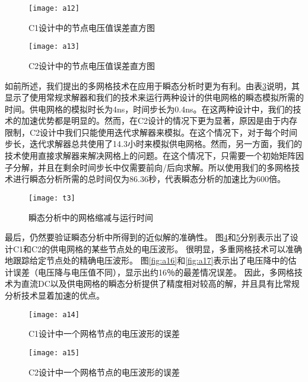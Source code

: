 \begin{figure}[H] %
  \centering
  \texttt{[image: a12]}
  \caption{C1设计中的节点电压值误差直方图}
  \label{fig:a12}
\end{figure}

\begin{figure}[H] %
  \centering
  \texttt{[image: a13]}
  \caption{C2设计中的节点电压值误差直方图}
  \label{fig:a13}
\end{figure}

如前所述，我们提出的多网格技术在应用于瞬态分析时更为有利。由表\ref{fig:t3}说明，其显示了使用常规求解器和我们的技术来运行两种设计的供电网格的瞬态模拟所需的时间。供电网格的模拟时长为4ns，时间步长为0.4ns。在这两种设计中，我们的技术的加速优势都是明显的。然而，在C2设计的情况下更为显著，原因是由于内存限制，C2设计中我们只能使用迭代求解器来模拟。在这个情况下，对于每个时间步长，迭代求解器总共使用了14.3小时来模拟供电网格。然而，另一方面，我们的技术使用直接求解器来解决网格上的问题。在这个情况下，只需要一个初始矩阵因子分解，并且在剩余时间步长中仅需要前向/后向求解。所以使用我们的多网格技术进行瞬态分析所需的总时间仅为86.36秒，代表瞬态分析的加速比为600倍。

\begin{figure}[H] %
  \centering
  \texttt{[image: t3]}
  \caption{瞬态分析中的网格缩减与运行时间}
  \label{fig:t3}
\end{figure}

最后，仍然要验证瞬态分析中所得到的近似解的准确性。 图\ref{fig:a14}和\ref{fig:a15}分别表示出了设计C1和C2的供电网格的某些节点处的电压波形。 很明显，多重网格技术可以准确地跟踪给定节点处的精确电压波形。 图\ref{fig:a16}和\ref{fig:a17}表示出了电压降中的估计误差（电压降与电压值不同），显示出约16％的最差情况误差。 因此，多网格技术为直流DC以及供电网格的瞬态分析提供了精度相对较高的解，并且具有比常规分析技术显着加速的优点。

\begin{figure}[H] %
  \centering
  \texttt{[image: a14]}
  \caption{C1设计中一个网格节点的电压波形的误差}
  \label{fig:a14}
\end{figure}

\begin{figure}[H] %
  \centering
  \texttt{[image: a15]}
  \caption{C2设计中一个网格节点的电压波形的误差}
  \label{fig:a15}
\end{figure}

